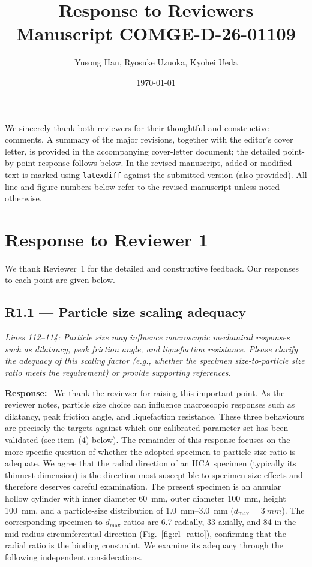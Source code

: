 \documentclass[11pt,a4paper]{article}
\title{Response to Reviewers\\
  \large Manuscript COMGE-D-26-01109}
\author{Yusong Han, Ryosuke Uzuoka, Kyohei Ueda}
\date{\today}
\newenvironment{rcomment}
  {\begin{leftbar}\color{black!75}\itshape}
  {\end{leftbar}\vspace{0.3em}}
\newcommand{\response}{\par\noindent\textbf{Response:}\ \ignorespaces}
\begin{document}
\maketitle

We sincerely thank both reviewers for their thoughtful and constructive
comments. A summary of the major revisions, together with the editor's
cover letter, is provided in the accompanying cover-letter document; the
detailed point-by-point response follows below. In the revised manuscript,
added or modified text is marked using \texttt{latexdiff} against the
submitted version (also provided). All line and figure numbers below refer
to the revised manuscript unless noted otherwise.

\clearpage


\section*{Response to Reviewer 1}

We thank Reviewer~1 for the detailed and constructive feedback. Our
responses to each point are given below.

\subsection*{R1.1 --- Particle size scaling adequacy}

\begin{rcomment}
Lines 112--114: Particle size may influence macroscopic mechanical responses
such as dilatancy, peak friction angle, and liquefaction resistance. Please
clarify the adequacy of this scaling factor (e.g., whether the specimen
size-to-particle size ratio meets the requirement) or provide supporting
references.
\end{rcomment}

\response
We thank the reviewer for raising this important point. As the
reviewer notes, particle size choice can influence macroscopic
responses such as dilatancy, peak friction angle, and liquefaction
resistance. These three behaviours are precisely the targets against
which our calibrated parameter set has been validated (see item~(4)
below). The remainder of this response focuses on the more specific
question of whether the adopted specimen-to-particle size ratio is
adequate. We agree that the radial direction of an HCA specimen
(typically its thinnest dimension) is the direction most susceptible
to specimen-size effects and therefore deserves careful examination.
The present specimen is an annular hollow cylinder with inner
diameter \SI{60}{mm}, outer diameter \SI{100}{mm}, height
\SI{100}{mm}, and a particle-size distribution of
\SIrange{1.0}{3.0}{mm} ($d_{\max}=\SI{3}{mm}$). The corresponding
specimen-to-$d_{\max}$ ratios are 6.7 radially, 33 axially, and 84
in the mid-radius circumferential direction
(Fig.~\ref{fig:rl_ratio}), confirming that the radial ratio is the
binding constraint. We examine its adequacy through the following
independent considerations.
\end{document}
